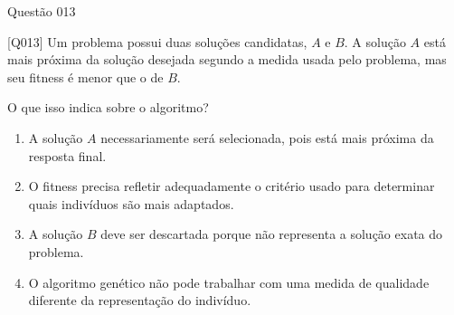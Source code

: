 \documentclass[xcolor=dvipsnames,table]{beamer}
\begin{document}
\begin{frame}{Questão 013}

    \begin{block}{[Q013]}
        Um problema possui duas soluções candidatas, $A$ e $B$. A solução $A$ está mais próxima da solução desejada segundo a medida usada pelo problema, mas seu fitness é menor que o de $B$.

        O que isso indica sobre o algoritmo?
    \end{block}

    \begin{enumerate}[label=(\Alph*)]

        \item A solução $A$ necessariamente será selecionada, pois está mais próxima da resposta final.

        \item O fitness precisa refletir adequadamente o critério usado para determinar quais indivíduos são mais adaptados.

        \item A solução $B$ deve ser descartada porque não representa a solução exata do problema.

        \item O algoritmo genético não pode trabalhar com uma medida de qualidade diferente da representação do indivíduo.

    \end{enumerate}

\end{frame}

	\begin{frame}
		\titlepage
	\end{frame}
	
\end{document}
